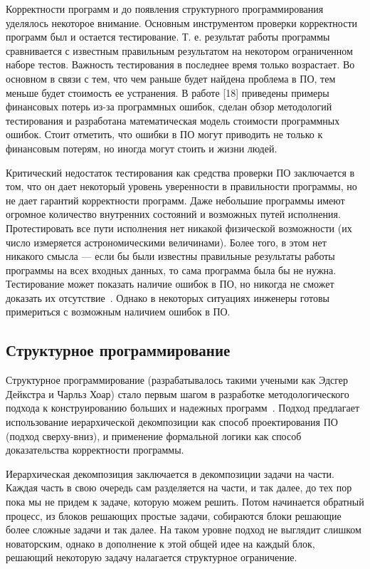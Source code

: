 Корректности программ и до появления структурного программирования уделялось некоторое внимание. Основным инструментом проверки корректности программ был и остается тестирование. Т. е. результат работы программы сравнивается с известным правильным результатом на некотором ограниченном наборе тестов. Важность тестирования в последнее время только возрастает. Во основном в связи с тем, что чем раньше будет найдена проблема в ПО, тем меньше будет стоимость ее устранения. В работе [18] приведены примеры финансовых потерь из-за программных ошибок, сделан обзор методологий тестирования и разработана математическая модель стоимости программных ошибок. Стоит отметить, что ошибки в ПО могут приводить не только к финансовым потерям, но иногда могут стоить и жизни людей.

Критический недостаток тестирования как средства проверки ПО заключается в том, что он дает некоторый уровень уверенности в правильности программы, но не дает гарантий корректности программ. Даже небольшие программы имеют огромное количество внутренних состояний и возможных путей исполнения. Протестировать все пути исполнения нет никакой физической возможности (их число измеряется астрономическими величинами). Более того, в этом нет никакого смысла — если бы были известны правильные результаты работы программы на всех входных данных, то сама программа была бы не нужна. Тестирование может показать наличие ошибок в ПО, но никогда не сможет доказать их отсутствие~\cite{Dijkstra:1972:CIN}. Однако в некоторых ситуациях инженеры готовы примериться с возможным наличием ошибок в ПО.

\subsection{Структурное программирование}

Структурное программирование (разрабатывалось такими учеными как Эдсгер Дейкстра и Чарльз Хоар) стало первым шагом в разработке методологического подхода к конструированию больших и надежных программ~\cite{Grier}. Подход предлагает использование иерархической декомпозиции как способ проектирования ПО (подход сверху-вниз), и применение формальной логики как способ доказательства корректности программы.

Иерархическая декомпозиция заключается в декомпозиции задачи на части. Каждая часть в свою очередь сам разделяется на части, и так далее, до тех пор пока мы не придем к задаче, которую можем решить. Потом начинается обратный процесс, из блоков решающих простые задачи, собираются блоки решающие более сложные задачи и так далее. На таком уровне подход не выглядит слишком новаторским, однако в дополнение к этой общей идее на каждый блок, решающий некоторую задачу налагается структурное ограничение. 

